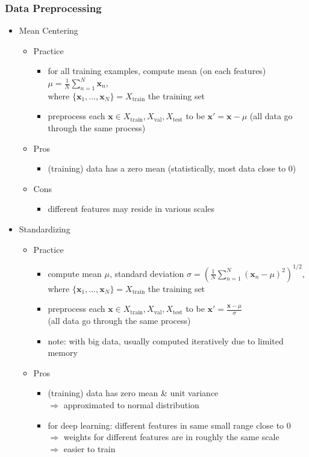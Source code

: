 \subsubsection{Data Preprocessing}
\begin{itemize}
\item Mean Centering
	\begin{itemize}
	\item Practice
		\begin{itemize}
		\item for all training examples, compute mean (on each features) $\displaystyle \mu=\frac 1 N \sum_{n=1}^N{\mathbf x_n}$, \\
		where $\{\mathbf x_1,...,\mathbf x_N\}=X_\text{train}$ the training set
		\item preprocess each $\mathbf x \in X_\text{train}, X_\text{val}, X_\text{test}$ to be $\mathbf x'=\mathbf x -\mu$
		(all data go through the same process)
		\end{itemize}
	\item Pros
		\begin{itemize}
		\item (training) data has a zero mean (statistically, most data close to $0$)
		\end{itemize}
	\item Cons
		\begin{itemize}
		\item different features may reside in various scales
		\end{itemize}
	\end{itemize}
\item Standardizing
	\begin{itemize}
	\item Practice
		\begin{itemize}
		\item compute mean $\mu$, standard deviation $\displaystyle \sigma=\left( \frac 1 N \sum_{n=1}^N{(\mathbf x_n-\mu)^2} \right)^{1/2}$, \\
		where $\{\mathbf x_1,...,\mathbf x_N\}=X_\text{train}$ the training set
		\item preprocess each $\mathbf x \in X_\text{train}, X_\text{val}, X_\text{test}$ to be $\mathbf x'=\frac{\mathbf x -\mu} \sigma$ \\ 
		(all data go through the same process)
		\item note: with big data, usually computed iteratively due to limited memory
		\end{itemize}
	\item Pros
		\begin{itemize}
		\item (training) data has zero mean \& unit variance \\
		$\Rightarrow$ approximated to normal distribution
		\item for deep learning: different features in same small range close to $0$ \\
		$\Rightarrow$ weights for different features are in roughly the same scale \\
		$\Rightarrow$ easier to train
		\end{itemize}
	\end{itemize}
\end{itemize}

